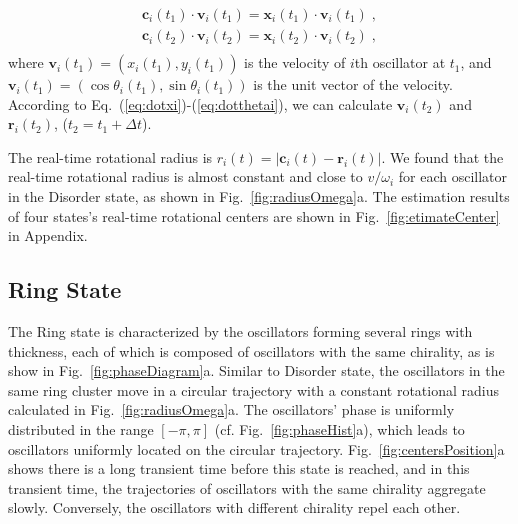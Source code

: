 \documentclass[%
 aip,
 amsmath,amssymb,
 reprint,%
]{revtex4-1}
\begin{document}
\begin{equation}\label{eq:linearEquations}
    \begin{array}{c}
        \mathbf{c}_i\left( t_1 \right) \cdot \mathbf{v}_i\left( t_1 \right) =\mathbf{x}_i\left( t_1 \right) \cdot \mathbf{v}_i\left( t_1 \right)\;,\\
        \mathbf{c}_i\left( t_2 \right) \cdot \mathbf{v}_i\left( t_2 \right) =\mathbf{x}_i\left( t_2 \right) \cdot \mathbf{v}_i\left( t_2 \right)\;,\\
    \end{array}
\end{equation}
where $\mathbf{v}_i(t_1)=\left( x_i\left( t_1 \right) , y_i\left( t_1 \right) \right)$ is the velocity of $i$th oscillator at $t_1$, and $\mathbf{v}_i(t_1)=\left( \cos \theta _i\left( t_1 \right) , \sin \theta _i\left( t_1 \right) \right)$ is the unit vector of the velocity. According to Eq.~(\ref{eq:dotxi})-(\ref{eq:dotthetai}), we can calculate $\mathbf{v}_i(t_2)$ and $\mathbf{r}_i(t_2)$, ($t_2=t_1+\Delta t$). 

The real-time rotational radius is $r_i(t)=\left| \mathbf{c}_i(t)-\mathbf{r}_i(t) \right|$. We found that the real-time rotational radius is almost constant and close to $v/\omega_i$ for each oscillator in the Disorder state, as shown in Fig.~\ref{fig:radiusOmega}a. The estimation results of four states's real-time rotational centers are shown in Fig.~\ref{fig:etimateCenter} in Appendix.

\subsection{Ring State}

The Ring state is characterized by the oscillators forming several rings with thickness, each of which is composed of oscillators with the same chirality, as is show in Fig.~\ref{fig:phaseDiagram}a. 
Similar to Disorder state, the oscillators in the same ring cluster move in a circular trajectory with a constant rotational radius calculated in Fig.~\ref{fig:radiusOmega}a. 
The oscillators' phase is uniformly distributed in the range $\left[ -\pi,\pi \right]$ (cf. Fig.~\ref{fig:phaseHist}a), which leads to oscillators uniformly located on the circular trajectory.
Fig.~\ref{fig:centersPosition}a shows there is a long transient time before this state is reached, and in this transient time, the trajectories of oscillators with the same chirality aggregate slowly. Conversely, the oscillators with different chirality repel each other. 
\end{document}
